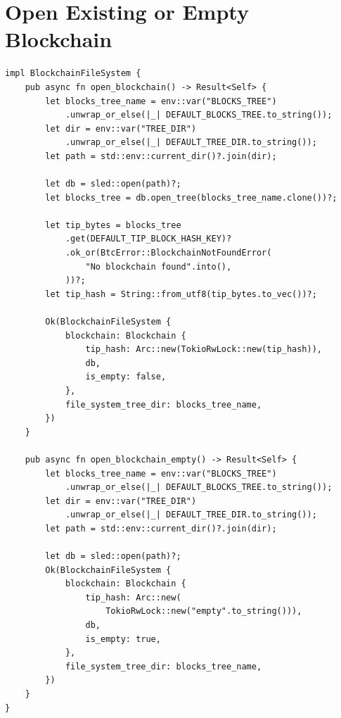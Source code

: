 \section{Open Existing or Empty Blockchain}
\label{sec:ch11-open-blockchain}

\begin{listing}[H]
\caption{Open existing or empty blockchain}
\label{lst:ch11-open}
\begin{verbatim}
impl BlockchainFileSystem {
    pub async fn open_blockchain() -> Result<Self> {
        let blocks_tree_name = env::var("BLOCKS_TREE")
            .unwrap_or_else(|_| DEFAULT_BLOCKS_TREE.to_string());
        let dir = env::var("TREE_DIR")
            .unwrap_or_else(|_| DEFAULT_TREE_DIR.to_string());
        let path = std::env::current_dir()?.join(dir);

        let db = sled::open(path)?;
        let blocks_tree = db.open_tree(blocks_tree_name.clone())?;

        let tip_bytes = blocks_tree
            .get(DEFAULT_TIP_BLOCK_HASH_KEY)?
            .ok_or(BtcError::BlockchainNotFoundError(
                "No blockchain found".into(),
            ))?;
        let tip_hash = String::from_utf8(tip_bytes.to_vec())?;

        Ok(BlockchainFileSystem {
            blockchain: Blockchain {
                tip_hash: Arc::new(TokioRwLock::new(tip_hash)),
                db,
                is_empty: false,
            },
            file_system_tree_dir: blocks_tree_name,
        })
    }

    pub async fn open_blockchain_empty() -> Result<Self> {
        let blocks_tree_name = env::var("BLOCKS_TREE")
            .unwrap_or_else(|_| DEFAULT_BLOCKS_TREE.to_string());
        let dir = env::var("TREE_DIR")
            .unwrap_or_else(|_| DEFAULT_TREE_DIR.to_string());
        let path = std::env::current_dir()?.join(dir);

        let db = sled::open(path)?;
        Ok(BlockchainFileSystem {
            blockchain: Blockchain {
                tip_hash: Arc::new(
                    TokioRwLock::new("empty".to_string())),
                db,
                is_empty: true,
            },
            file_system_tree_dir: blocks_tree_name,
        })
    }
}
\end{verbatim}
\end{listing}

